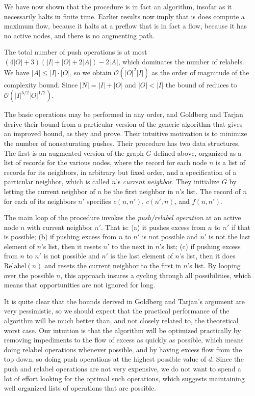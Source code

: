 \documentclass[12pt, A4paper]{article}
\theoremstyle{definition}
\newcommand{\cO}{\mathcal{O}}
\begin{document}
We have now shown that the procedure is in fact an algorithm, insofar as it necessarily halts in finite time.  Earlier results now imply that is does compute a maximum flow, because it halts at a preflow that is in fact a flow, because it has no active nodes, and there is no augmenting path.

The total number of push operations is at most $(4|O| + 3)(|I| + |O| + 2|A|) - 2|A|$, which dominates the number of relabels.  We have $|A| \le |I| \cdot |O|$, so we obtain $\cO(|O|^2|I|)$ as the order of magnitude of the complexity bound.  Since $|N| = |I| + |O|$ and $|O| < |I|$ the bound of \cite{ChMa05} reduces to $\cO(|I|^{5/2}|O|^{1/2})$.

The basic operations may be performed in any order, and Goldberg and Tarjan derive their bound from a particular version of the generic algorithm that gives an improved bound, as they and \cite{ChMa05} prove.  Their intuitive motivation is to minimize the number of nonsaturating pushes. 
Their procedure has two data structures.  The first is an augmented version of the graph $G$ defined above, organized as a list of records for the various nodes, where the record for each node $n$ is a list of records for its neighbors, in arbitrary but fixed order, and a specification of a particular neighbor, which is called $n$'s \emph{current neighbor}.  They initialize $G$ by letting the current neighbor of $n$ be the first neighbor in $n$'s list.  The record of $n$ for each of its neighbors $n'$ specifies $c(n,n')$, $c(n',n)$, and $f(n,n')$.  

The main loop of the procedure invokes the \emph{push/relabel operation} at an active node $n$ with current neighbor $n'$.  That is: (a) it pushes excess from $n$ to $n'$ if that is possible; (b) if pushing excess from $n$ to  $n'$ is not possible and $n'$ is not the last element of $n$'s list, then it resets $n'$ to the next in $n$'s list; (c) if pushing excess from $n$ to $n'$ is not possible and $n'$ is the last element of $n$'s list, then it does $\mathrm{Relabel}(n)$ and resets the current neighbor to the first in $n$'s list.  By looping over the possible $n$, this approach insures a cycling through all possibilities, which means that opportunities are not ignored for long.

It is quite clear that the bounds derived in Goldberg and Tarjan's argument are very pessimistic, so we should expect that the practical performance of the algorithm will be much better than, and not closely related to, the theoretical worst case.  Our intuition is that the algorithm will be optimized practically by removing impediments to the flow of excess as quickly as possible, which means doing relabel operations whenever possible, and by having excess flow from the top down, so doing push operations at the highest possible value of $d$.  Since the push and relabel operations are not very expensive, we do not want to spend a lot of effort looking for the optimal such operations, which suggests maintaining well organized lists of operations that are possible.
\end{document}

